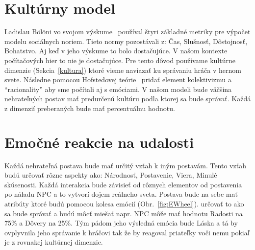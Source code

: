 \documentclass[10pt,twoside,slovak,a4paper]{article}
\begin{document}
\section{Kultúrny model}\label{model}

Ladislau B\"{o}l\"{o}ni vo svojom výskume~\cite{computationalmodel2018} používal štyri
základné metriky pre výpočet modelu sociálnych noriem. Tieto normy pozostávali z: Čas, 
Slušnosť, Dôstojnosť, Bohatstvo. Aj keď v jeho výskume to bolo dostačujúce. V našom kontexte 
počítačových hier to nie je dostačujúce. Pre tento dôvod používame kultúrne dimenzie 
(Sekcia~\ref{kultura}) ktoré vieme naviazať ku správaniu hráča v hernom svete. Následne 
pomocou Hofstedovej teórie~\cite{hofstede2010cultures} pridať element kolektivizmu a ``racionality'' 
aby sme počítali aj s emóciami. V našom modeli bude väčšina nehrateľných postav mať predurčenú 
kultúru podla ktorej sa bude správať. Každá z dimenzií preberaných bude mať percentuálnu hodnotu.

\section{Emočné reakcie na udalosti}\label{reakcie}

Každá nehrateľná postava bude mať určitý vzťah k iným postavám. Tento vzťah budú
určovať rôzne aspekty ako: Národnosť, Postavenie, Viera, Minulé skúsenosti.
Každá interakcia bude závisieť od rôznych elementov od postavenia po náladu NPC
a to vytvorí dojem reálneho sveta. Postava bude na sebe mať atribúty ktoré budú pomocou kolesa emócií
(Obr.~\ref{fig:EWheel}). určovať to ako sa bude správať a budú môcť miešať napr. NPC môže mať hodnotu
Radosti na 75\% a Dôvery na 25\%. Tým pádom jeho výsledná emócia bude Láska a tá by ovplyvnila jeho
správanie k hráčovi tak že by reagoval priateľky voči nemu pokiaľ je z rovnakej kultúrnej dimenzie.
\end{document}
